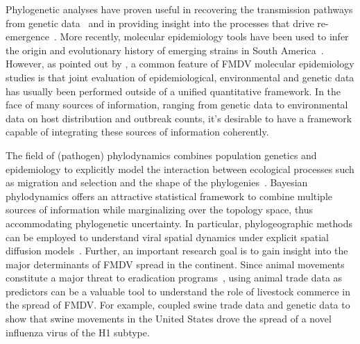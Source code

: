 \documentclass[10pt]{article}
\begin{document}
Phylogenetic analyses have proven useful in recovering the transmission pathways from genetic data~\citep{Cottam2008a, Cottam2008b} and in providing insight into the processes that drive re-emergence~\citep{DiNardo2011}.
More recently, molecular epidemiology tools have been used to infer the origin and evolutionary history of emerging strains in South America~\citep{Perez2001, Malirat2007, Malirat2011a, Malirat2011b, Maradei2013}.
However, as pointed out by \citet{DiNardo2011}, a common feature of FMDV molecular epidemiology studies is that  joint evaluation of epidemiological, environmental and genetic data has usually been performed outside of a unified quantitative framework. %
In the face of many sources of information, ranging from genetic data to environmental data on host distribution and outbreak counts, it's desirable to have a framework capable of integrating these sources of information coherently. %

The field of (pathogen) phylodynamics combines population genetics and epidemiology to explicitly  model the interaction between ecological processes such as migration and selection and the shape of the phylogenies~\citep{Grenfell2004, Volz2013}.
Bayesian phylodynamics offers an attractive statistical framework to combine multiple sources of information while marginalizing over the topology space, thus accommodating phylogenetic uncertainty.
In particular, phylogeographic methods can be employed to understand viral spatial dynamics under explicit spatial diffusion models~\citep{Lemey2009}.
Further, an important research goal is to gain insight into the major determinants of FMDV spread in the continent.
Since animal movements constitute a major threat to eradication programs~\citep{Schley2009}, using animal trade data as predictors can be a valuable tool to understand the role of livestock commerce in the spread of FMDV.
For example, \citet{Nelson2011} coupled swine trade data and genetic data to show that swine movements in the United States drove the spread of a novel influenza virus of the H1 subtype. %
\end{document}
